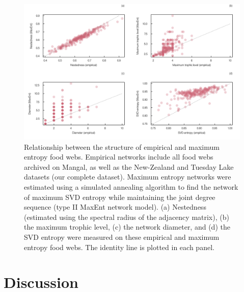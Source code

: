 \documentclass[10pt,oneside]{article}
\makeatletter
\def\maxwidth{\ifdim\Gin@nat@width>\linewidth\linewidth
\else\Gin@nat@width\fi}
\let\Oldincludegraphics\includegraphics
\renewcommand{\includegraphics}[1]{\Oldincludegraphics[width=\maxwidth]{#1}}
\makeatother
\begin{document}
\begin{figure}
\hypertarget{fig:measures}{%
\centering
\includegraphics{figures/measures_emp_maxent.png}
\caption{Relationship between the structure of empirical and maximum
entropy food webs. Empirical networks include all food webs archived on
Mangal, as well as the New-Zealand and Tuesday Lake datasets (our
complete dataset). Maximum entropy networks were estimated using a
simulated annealing algorithm to find the network of maximum SVD entropy
while maintaining the joint degree sequence (type II MaxEnt network
model). (a) Nestedness (estimated using the spectral radius of the
adjacency matrix), (b) the maximum trophic level, (c) the network
diameter, and (d) the SVD entropy were measured on these empirical and
maximum entropy food webs. The identity line is plotted in each
panel.}\label{fig:measures}
}
\end{figure}

\hypertarget{discussion}{%
\section{Discussion}\label{discussion}}
\end{document}
